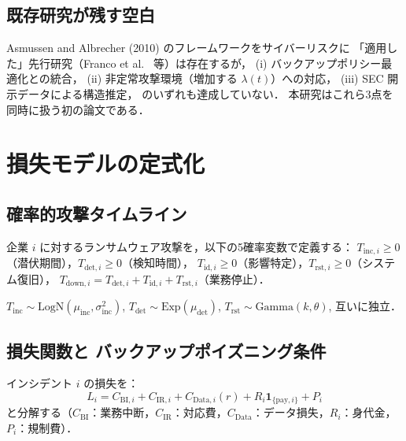 \documentclass{ipsjlike}
\newcommand{\ind}{\mathbf{1}}
\begin{document}
\subsection{既存研究が残す空白}

Asmussen and Albrecher (2010) のフレームワークをサイバーリスクに
「適用した」先行研究（Franco et al.~\cite{franco2021rcvar} 等）は存在するが，
(i) バックアップポリシー最適化との統合，
(ii) 非定常攻撃環境（増加する $\lambda(t)$）への対応，
(iii) SEC 開示データによる構造推定，
のいずれも達成していない．
本研究はこれら3点を同時に扱う初の論文である．

\section{損失モデルの定式化}
\label{sec:timeline}

\subsection{確率的攻撃タイムライン}

\begin{definition}[攻撃タイムライン]\label{def:timeline}
  企業 $i$ に対するランサムウェア攻撃を，以下の5確率変数で定義する：
  $T_{\mathrm{inc},i} \geq 0$（潜伏期間），$T_{\mathrm{det},i} \geq 0$（検知時間），
  $T_{\mathrm{id},i} \geq 0$（影響特定），$T_{\mathrm{rst},i} \geq 0$（システム復旧），
  $T_{\mathrm{down},i} = T_{\mathrm{det},i} + T_{\mathrm{id},i} + T_{\mathrm{rst},i}$（業務停止）．
\end{definition}

\begin{assumption}[フェーズ時間分布]\label{ass:phase}
  $T_{\mathrm{inc}} \!\sim\! \mathrm{LogN}(\mu_{\mathrm{inc}},\sigma_{\mathrm{inc}}^2)$,\;
  $T_{\mathrm{det}} \!\sim\! \mathrm{Exp}(\mu_{\mathrm{det}})$,\;
  $T_{\mathrm{rst}} \!\sim\! \mathrm{Gamma}(k,\theta)$,\;
  互いに独立．
\end{assumption}

\subsection{損失関数と バックアップポイズニング条件}

インシデント $i$ の損失を：
\begin{equation}
  L_i = C_{\mathrm{BI},i} + C_{\mathrm{IR},i}
      + C_{\mathrm{Data},i}(r)
      + R_i \ind_{\{\mathrm{pay},i\}} + P_i
  \label{eq:loss}
\end{equation}
と分解する（$C_{\mathrm{BI}}$：業務中断，$C_{\mathrm{IR}}$：対応費，$C_{\mathrm{Data}}$：データ損失，$R_i$：身代金，$P_i$：規制費）．
\end{document}
